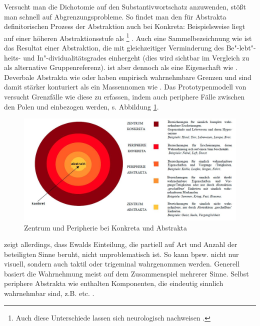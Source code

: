 Versucht man die Dichotomie  auf den Substantivwortschatz anzuwenden, stößt man schnell auf Abgrenzungsprobleme. So findet man den für Abstrakta definitorischen Prozess der Abstraktion auch bei Konkreta: Beispielsweise liegt  auf einer höheren Abstraktionsstufe als \footnote{Auch diese Unterschiede lassen sich neurologisch nachweisen \parencite[s.][]{Ghio2013}.} \parencite[274]{Ewald1992}. Auch eine Sammelbezeichnung wie  ist das Resultat einer Abstraktion, die mit gleichzeitiger Verminderung des Be"-lebt"-heits- und In"-dividualitätsgrades einhergeht (dies wird sichtbar im Vergleich zu  als alternative Gruppenreferenz).  ist aber dennoch  als eine Eigenschaft wie . Deverbale Abstrakta wie  oder  haben empirisch wahrnehmbare Grenzen und sind damit stärker konturiert als ein Massennomen wie . Das Prototypenmodell von \textcite[279f.]{Ewald1992} versucht Grenzfälle wie diese zu erfassen, indem auch periphere Fälle zwischen den Polen  und  einbezogen werden, s. Abbildung \ref{abb:schrauf-ewald}. 

\begin{figure}[h]
\begin{center}
\includegraphics[width=12cm]{images/schrauff-ewald-neu.jpg}
\caption {Zentrum und Peripherie bei Konkreta und Abstrakta \parencite[][41]{Schrauf2011}}
\label{abb:schrauf-ewald}
\end{center}
\end{figure}


\textcite{Schrauf2011} zeigt allerdings, dass Ewalds Einteilung, die partiell auf Art und Anzahl der beteiligten Sinne beruht, nicht unproblematisch ist. So kann  bpsw. nicht nur visuell, sondern auch taktil oder trigeminal wahrgenommen werden. Generell basiert die Wahrnehmung meist auf dem Zusammenspiel mehrerer Sinne. Selbst periphere Abstrakta wie  enthalten Komponenten, die eindeutig sinnlich wahrnehmbar sind, z.B.  etc. \parencite[vgl.][41]{Schrauf2011}. 

